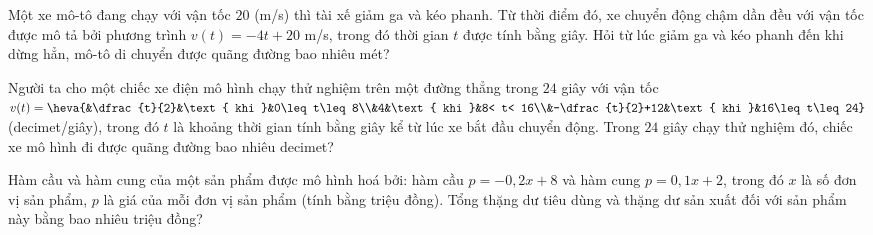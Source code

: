 
\begin{bt}%
	Một xe mô-tô đang chạy với vận tốc $20$ (m/s) thì tài xế giảm ga và kéo phanh. Từ thời điểm đó, xe chuyển động chậm dần đều với vận tốc được  mô tả bởi phương trình $v(t)=-4t+20$ m/s, trong đó thời gian $t$ được tính bằng giây. Hỏi từ lúc giảm ga và kéo phanh đến khi dừng hẳn, mô-tô di chuyển được quãng đường bao nhiêu mét?
\end{bt}

\begin{bt}%
	Người ta cho một chiếc xe điện mô hình chạy thử nghiệm trên một đường thẳng trong $24$ giây với vận tốc $v(t)=\heva{&\dfrac{t}{2}&\text{ khi }&0\leq t\leq 8\\&4&\text{ khi }&8< t< 16\\&-\dfrac{t}{2}+12&\text{ khi }&16\leq t\leq 24}$ (decimet/giây), trong đó $t$ là khoảng thời gian tính bằng giây kể từ lúc xe bắt đầu chuyển động. Trong $24$ giây chạy thử nghiệm đó, chiếc xe mô hình đi được quãng đường bao  nhiêu decimet?
\end{bt}

\begin{bt}%
	Hàm cầu và hàm cung của một sản  phẩm được mô hình hoá bởi: hàm cầu $p=-0{,}2x+8$ và
	hàm cung $p=0{,}1x+2$, trong đó $x$ là số đơn vị sản phẩm, $p$ là giá của mỗi đơn vị sản phẩm (tính bằng triệu đồng). Tổng thặng dư tiêu  dùng và thặng dư sản xuất đối với sản phẩm này bằng bao nhiêu triệu đồng?
\end{bt}

